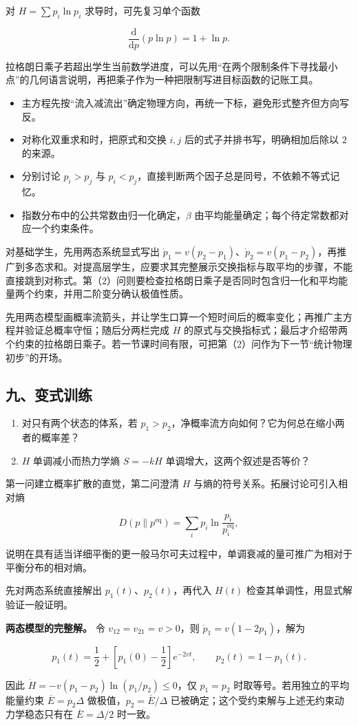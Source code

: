 \documentclass[12pt,a4paper,UTF8]{ctexart}
\newcommand{\tightlist}{\setlength{\itemsep}{0pt}\setlength{\parskip}{0pt}}
\begin{document}
对 \(H=\sum p_i\ln p_i\) 求导时，可先复习单个函数

\[\frac{\mathrm d}{\mathrm dp}(p\ln p)=1+\ln p.\]

拉格朗日乘子若超出学生当前数学进度，可以先用``在两个限制条件下寻找最小点''的几何语言说明，再把乘子作为一种把限制写进目标函数的记账工具。

\begin{itemize}
\tightlist
\item
  主方程先按``流入减流出''确定物理方向，再统一下标，避免形式整齐但方向写反。
\item
  对称化双重求和时，把原式和交换 \(i,j\)
  后的式子并排书写，明确相加后除以 \(2\) 的来源。
\item
  分别讨论 \(p_i>p_j\) 与
  \(p_i<p_j\)，直接判断两个因子总是同号，不依赖不等式记忆。
\item
  指数分布中的公共常数由归一化确定，\(\beta\)
  由平均能量确定；每个待定常数都对应一个约束条件。
\end{itemize}

对基础学生，先用两态系统显式写出
\(\dot p_1=v(p_2-p_1)\)、\(\dot p_2=v(p_1-p_2)\)，再推广到多态求和。对提高层学生，应要求其完整展示交换指标与取平均的步骤，不能直接跳到对称式。第（2）问则要检查拉格朗日乘子是否同时包含归一化和平均能量两个约束，并用二阶变分确认极值性质。

先用两态模型画概率流箭头，并让学生口算一个短时间后的概率变化；再推广主方程并验证总概率守恒；随后分两栏完成
\(\dot H\)
的原式与交换指标式；最后才介绍带两个约束的拉格朗日乘子。若一节课时间有限，可把第（2）问作为下一节``统计物理初步''的开场。

\subsection{九、变式训练}\label{ux4e5dux53d8ux5f0fux8badux7ec3-7}

\begin{enumerate}
\def\labelenumi{\arabic{enumi}.}
\tightlist
\item
  对只有两个状态的体系，若
  \(p_1>p_2\)，净概率流方向如何？它为何总在缩小两者的概率差？
\item
  \(H\) 单调减小而热力学熵 \(S=-kH\) 单调增大，这两个叙述是否等价？
\end{enumerate}

第一问建立概率扩散的直觉，第二问澄清 \(H\)
与熵的符号关系。拓展讨论可引入相对熵

\[D(p\|p^{\mathrm{eq}})
=\sum_i p_i\ln\frac{p_i}{p_i^{\mathrm{eq}}},\]

说明在具有适当详细平衡的更一般马尔可夫过程中，单调衰减的量可推广为相对于平衡分布的相对熵。

先对两态系统直接解出 \(p_1(t)\)、\(p_2(t)\)，再代入 \(H(t)\)
检查其单调性，用显式解验证一般证明。

\textbf{两态模型的完整解。} 令 \(v_{12}=v_{21}=v>0\)，则
\(\dot p_1=v(1-2p_1)\)，解为

\[p_1(t)=\frac12+\left[p_1(0)-\frac12\right]e^{-2vt},\qquad p_2(t)=1-p_1(t).\]

因此 \(\dot H=-v(p_1-p_2)\ln(p_1/p_2)\le0\)，仅 \(p_1=p_2\)
时取等号。若用独立的平均能量约束 \(\overline E=p_2\Delta\)
做极值，\(p_2=\overline E/\Delta\)
已被确定；这个受约束解与上述无约束动力学稳态只有在
\(\overline E=\Delta/2\) 时一致。
\end{document}
